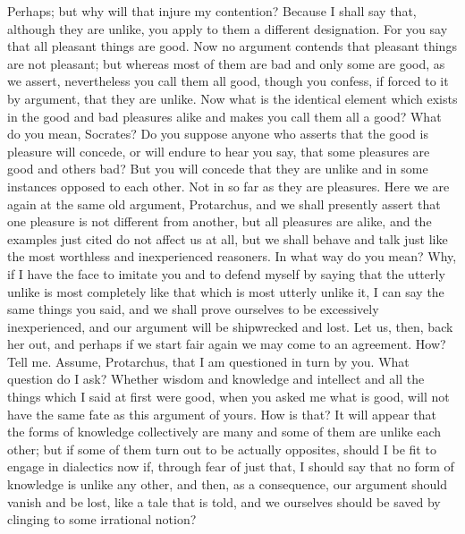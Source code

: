 \documentclass[letterpaper,12pt]{article}
\newcommand{\stephpag}[1]{\marginnote{\small\itshape\fontfamily{ppl}\selectfont #1}}
\begin{document}
\begin{drama}
\protarchusspeaks
Perhaps; but why will that injure my contention?
\socratesspeaks
Because I shall say that, although they are unlike, you apply to them a different designation. For you say that all pleasant things are good. Now no argument contends \stephpag{b} that pleasant things are not pleasant; but whereas most of them are bad and only some are good, as we assert, nevertheless you call them all good, though you confess, if forced to it by argument, that they are unlike. Now what is the identical element which exists in the good and bad pleasures alike and makes you call them all a good?
\protarchusspeaks
What do you mean, Socrates? Do you suppose anyone who asserts that the good is pleasure will concede, or will endure to hear you say, that some pleasures are good \stephpag{c} and others bad?
\socratesspeaks
But you will concede that they are unlike and in some instances opposed to each other.
\protarchusspeaks
Not in so far as they are pleasures.
\socratesspeaks
Here we are again at the same old argument, Protarchus, and we shall presently assert that one pleasure is not different from another, but all pleasures are alike, and the examples just cited do not affect us at all, but we shall behave and talk just like the most worthless \stephpag{d} and inexperienced reasoners.
\protarchusspeaks
In what way do you mean?
\socratesspeaks
Why, if I have the face to imitate you and to defend myself by saying that the utterly unlike is most completely like that which is most utterly unlike it, I can say the same things you said, and we shall prove ourselves to be excessively inexperienced, and our argument will be shipwrecked and lost. Let us, then, back her out, and perhaps if we start fair again we may come to an agreement. \stephpag{e}
\protarchusspeaks
How? Tell me.
\socratesspeaks
Assume, Protarchus, that I am questioned in turn by you.
\protarchusspeaks
What question do I ask?
\socratesspeaks
Whether wisdom and knowledge and intellect and all the things which I said at first were good, when you asked me what is good, will not have the same fate as this argument of yours.
\protarchusspeaks
How is that?
\socratesspeaks
It will appear that the forms of knowledge collectively are many and some of them are unlike each other; but if some of them \stephpag{14 a} turn out to be actually opposites, should I be fit to engage in dialectics now if, through fear of just that, I should say that no form of knowledge is unlike any other, and then, as a consequence, our argument should vanish and be lost, like a tale that is told, and we ourselves should be saved by clinging to some irrational notion?

\end{drama}
\end{document}
